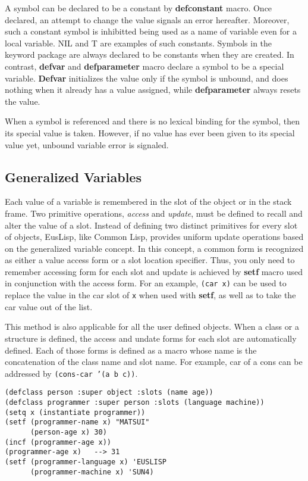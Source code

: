 A symbol can be declared to be a constant by {\bf defconstant} macro.
Once declared, an attempt to change the value signals an error hereafter.
Moreover, such a constant symbol is inhibitted being used as
a name of variable even for a local variable.
NIL and T are examples of such constants.
Symbols in the keyword package are always declared to be constants
when they are created.
In contrast, {\bf defvar} and {\bf defparameter} macro declare
a symbol to be a special variable.
{\bf Defvar} initializes the value only if the symbol is unbound,
and does nothing when it already has a value assigned,
while {\bf defparameter} always resets the value.

When a symbol is referenced and there is no lexical binding for the symbol,
then its special value is taken.
However, if no value has ever been given to its special value yet,
unbound variable error is signaled.

\subsection{Generalized Variables}
Each value of a variable is remembered in the slot of the object or in
the stack frame.
Two primitive operations, {\em access} and {\em update}, must be defined
to recall and alter the value of a slot.
Instead of defining two distinct primitives for every slot of objects,
EusLisp, like Common Lisp, provides uniform update operations
based on the generalized variable concept.
In this concept, a common form is recognized as either a value access form
or a slot location specifier.
Thus, you only need to remember accessing form for each slot and
update is achieved by {\bf setf} macro used in conjunction with the access form.
For an example, {\tt (car x)} can be used to replace the value
in the car slot of {\tt x} when used with {\bf setf},
as well as to take the car value out of the list.

This method is also applicable for all the user defined objects.
When a class or a structure is defined, the access and undate forms
for each slot are automatically defined.
Each of those forms is defined as a macro whose name is the concatenation of
the class name and slot name.
For example, car of a cons can be addressed by {\tt (cons-car '(a b c))}.

\begin{verbatim}
(defclass person :super object :slots (name age))
(defclass programmer :super person :slots (language machine))
(setq x (instantiate programmer))
(setf (programmer-name x) "MATSUI"
      (person-age x) 30)
(incf (programmer-age x))
(programmer-age x)   --> 31
(setf (programmer-language x) 'EUSLISP
      (programmer-machine x) 'SUN4)
\end{verbatim}

